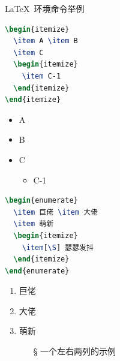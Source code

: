 \documentclass[no-math]{ctexbeamer}
\begin{document}
\begin{frame}[fragile]{\LaTeX\ 环境命令举例}
    \begin{minipage}{0.4\linewidth}
        \begin{lstlisting}[language=TeX]
\begin{itemize}
  \item A \item B
  \item C
  \begin{itemize}
    \item C-1
  \end{itemize}
\end{itemize}
        \end{lstlisting}
    \end{minipage}
    \hspace{.5cm}
    \begin{minipage}{0.3\linewidth}
        \begin{itemize}
            \item A
            \item B
            \item C
            \begin{itemize}
                \item C-1
            \end{itemize}
        \end{itemize}
    \end{minipage}
    \medskip
    \begin{minipage}{0.4\linewidth}
        \begin{lstlisting}[language=TeX]
\begin{enumerate}
  \item 巨佬 \item 大佬
  \item 萌新
  \begin{itemize}
    \item[\S] 瑟瑟发抖
  \end{itemize}
\end{enumerate}
        \end{lstlisting}
    \end{minipage}
    \hspace{.5cm}
    \begin{minipage}{0.45\linewidth}
        \begin{enumerate}
            \item 巨佬
            \item 大佬
            \item 萌新
            \begin{itemize}
                \item[\S] 一个左右两列的示例
            \end{itemize}
        \end{enumerate}
    \end{minipage}
\end{frame}
\end{document}
